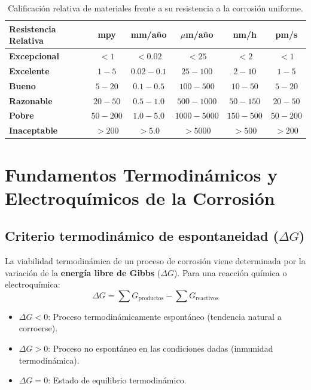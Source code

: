 \begin{table}[H]
    \centering
    \caption{Calificación relativa de materiales frente a su resistencia a la corrosión uniforme.}
    \begin{tabular}{lccccc}
        \toprule
        \textbf{Resistencia Relativa} & \textbf{mpy} & \textbf{mm/año} & \textbf{$\mu$m/año} & \textbf{nm/h} & \textbf{pm/s} \\
        \midrule
        \textbf{Excepcional} & $< 1$ & $< 0.02$ & $< 25$ & $< 2$ & $< 1$ \\
        \textbf{Excelente} & $1 - 5$ & $0.02 - 0.1$ & $25 - 100$ & $2 - 10$ & $1 - 5$ \\
        \textbf{Bueno} & $5 - 20$ & $0.1 - 0.5$ & $100 - 500$ & $10 - 50$ & $5 - 20$ \\
        \textbf{Razonable} & $20 - 50$ & $0.5 - 1.0$ & $500 - 1000$ & $50 - 150$ & $20 - 50$ \\
        \textbf{Pobre} & $50 - 200$ & $1.0 - 5.0$ & $1000 - 5000$ & $150 - 500$ & $50 - 200$ \\
        \textbf{Inaceptable} & $> 200$ & $> 5.0$ & $> 5000$ & $> 500$ & $> 200$ \\
        \bottomrule
    \end{tabular}
    \label{tab:clasificacion_resistencia}
\end{table}

\section{Fundamentos Termodinámicos y Electroquímicos de la Corrosión}

\subsection{Criterio termodinámico de espontaneidad ($\Delta G$)}
La viabilidad termodinámica de un proceso de corrosión viene determinada por la variación de la \textbf{energía libre de Gibbs} ($\Delta G$). Para una reacción química o electroquímica:
\begin{equation}
    \Delta G = \sum G_{\text{productos}} - \sum G_{\text{reactivos}}
\end{equation}
\begin{itemize}
    \item $\Delta G < 0$: Proceso termodinámicamente espontáneo (tendencia natural a corroerse).
    \item $\Delta G > 0$: Proceso no espontáneo en las condiciones dadas (inmunidad termodinámica).
    \item $\Delta G = 0$: Estado de equilibrio termodinámico.
\end{itemize}

